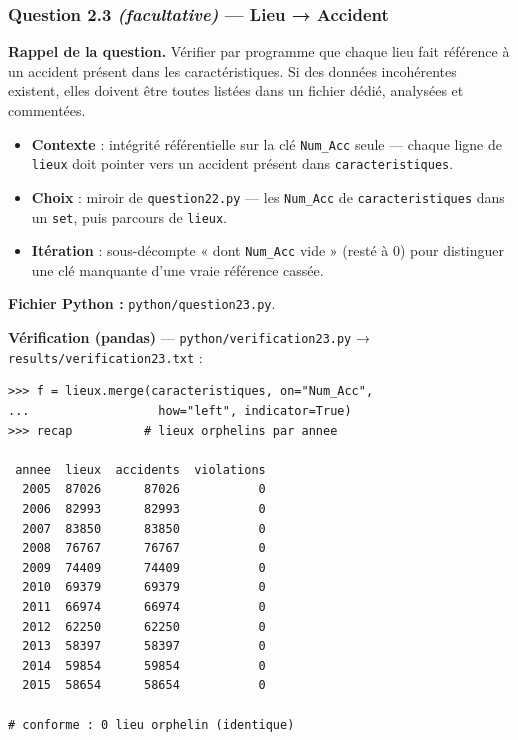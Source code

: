 \documentclass[11pt,a4paper]{article}
\newcommand{\rub}[2]{\textbf{\textcolor{#1}{#2}}}
\begin{document}
\clearpage
\subsubsection*{Question 2.3 \emph{(facultative)} — Lieu → Accident}

\rub{labrappel}{Rappel de la question.} Vérifier par programme que chaque lieu fait référence à un accident présent dans les caractéristiques. Si des données incohérentes existent, elles doivent être toutes listées dans un fichier dédié, analysées et commentées.

\begin{agentbox}
\begin{itemize}
\item \textbf{Contexte} : intégrité référentielle sur la clé \texttt{Num\_Acc} seule — chaque ligne de \texttt{lieux} doit pointer vers un accident présent dans \texttt{caracteristiques}.
\item \textbf{Choix} : miroir de \texttt{question22.py} — les \texttt{Num\_Acc} de \texttt{caracteristiques} dans un \texttt{set}, puis parcours de \texttt{lieux}.
\item \textbf{Itération} : sous-décompte « dont \texttt{Num\_Acc} vide » (resté à 0) pour distinguer une clé manquante d'une vraie référence cassée.
\end{itemize}
\end{agentbox}

\rub{labfichier}{Fichier Python :} \texttt{python/question23.py}.

\rub{labverif}{Vérification (pandas)} --- \texttt{python/verification23.py} → \texttt{results/verification23.txt} :

\begin{lstlisting}[style=pyblock]
>>> f = lieux.merge(caracteristiques, on="Num_Acc",
...                  how="left", indicator=True)
>>> recap          # lieux orphelins par annee

 annee  lieux  accidents  violations
  2005  87026      87026           0
  2006  82993      82993           0
  2007  83850      83850           0
  2008  76767      76767           0
  2009  74409      74409           0
  2010  69379      69379           0
  2011  66974      66974           0
  2012  62250      62250           0
  2013  58397      58397           0
  2014  59854      59854           0
  2015  58654      58654           0

# conforme : 0 lieu orphelin (identique)
\end{lstlisting}
\end{document}
